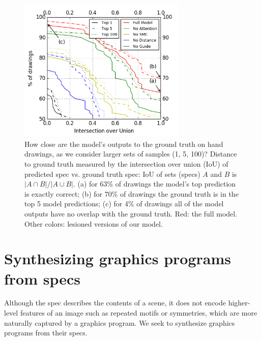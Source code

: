 \documentclass{article}
\theoremstyle{definition}
\begin{document}
\begin{figure}[h]\vspace{-1cm}\centering
  \begin{minipage}[c]{0.57\textwidth} 
    \centering  \includegraphics[width = 8cm]{figures/drawingAccuracy.png}            \vspace{-0.5cm} 
  \end{minipage}\hfill%
      \begin{minipage}[c]{0.4\textwidth} 
  \caption{How close are the model's outputs to the ground truth on hand drawings, as we consider larger sets of samples (1, 5, 100)?
    Distance to ground truth measured by the intersection over union (IoU) of predicted spec vs. ground truth spec: IoU of sets (specs) $A$ and $B$ is $|A\cap B|/|A\cup B|$. (a) for 63\% of drawings the model's top prediction is exactly correct; (b) for 70\% of drawings the ground truth is in the top 5 model predictions; (c) for 4\% of drawings all of the model outputs have no overlap with the ground truth. Red: the full model. Other colors: lesioned versions of our model.}\label{drawingIntersectionOverUnion}            \vspace{-0.5cm}
      \end{minipage}

\end{figure}






\section{Synthesizing graphics programs from specs}\label{programSynthesisSection}
Although the spec describes the contents
of a scene, it does not encode higher-level features of an image
such as repeated motifs or symmetries, which are more naturally captured by a graphics program.
We seek to synthesize graphics programs from their specs.
\end{document}
